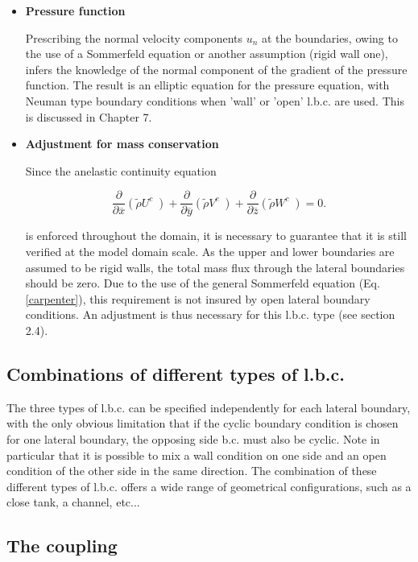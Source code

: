 \begin{itemize}
\item {\bf Pressure function}

Prescribing the normal velocity components $u_n$ at the boundaries, owing to
the use of a Sommerfeld equation or another assumption (rigid wall one),
infers the knowledge of the normal component of the gradient of the
pressure function. The result is an elliptic equation for the pressure
equation, with Neuman type boundary conditions when 'wall' or 'open'
l.b.c. are used. This is discussed in Chapter 7.

\item {\bf Adjustment for mass conservation}

Since the anelastic continuity equation

\begin{equation}
\label{continuity}
  \dfrac{\partial }{\partial \overline{x} } (\tilde{\rho} U^{c} \; )
+ \dfrac{\partial }{\partial \overline{y} } (\tilde{\rho} V^{c} \; )
+ \dfrac{\partial }{\partial \overline{z} } (\tilde{\rho} W^{c} \; ) =0.
\end{equation}

\noindent
is enforced throughout the domain,
it is necessary to guarantee that it is still verified at the model domain
scale. As the upper and lower boundaries are
assumed to be rigid walls, the total mass flux through the
lateral boundaries should be zero. Due to the use of the general Sommerfeld
equation (Eq. \ref{carpenter}), this requirement is not insured by open lateral boundary
conditions. An adjustment is thus necessary for this l.b.c. type (see section
2.4).


\end{itemize}

\subsection{Combinations of different types of l.b.c.}

 The three types of l.b.c. can be specified independently for each lateral
boundary, with the only obvious limitation that
if the cyclic boundary condition is chosen for one lateral boundary,
the opposing side b.c. must also be cyclic. Note in particular that it is
possible to mix a wall condition on one side and an open condition of the
other side in the same direction.
 The combination of these different types of l.b.c. offers
a wide range of geometrical configurations, such as a close tank, a
channel, etc...

\subsection{The coupling}

